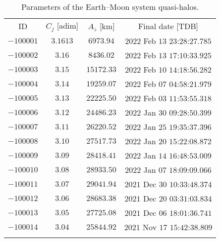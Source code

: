 %
%
\begin{table}[b!]
	\caption{Parameters of the Earth--Moon system quasi-halos.}
	\label{tab:EMquasihalo}
	\centering
	\footnotesize
	\begin{tabular}{cccc}
		\TOPlines
		ID & $C_j$ [adim] & $A_z$ [km] &  Final date [TDB] \\
		\MIDline
		$-100001$ & $3.1613$ & $6973.94$ & $2022$ Feb $13$ $23$:$28$:$27.785$ \\
		$-100002$ & $3.16$ &  $8436.02$ & $2022$ Feb $13$ $17$:$10$:$33.925$ \\
		$-100003$ & $3.15$ & $15172.33$ & $2022$ Feb $10$ $14$:$18$:$56.282$ \\
		$-100004$ & $3.14$ & $19259.07$ & $2022$ Feb $07$ $04$:$58$:$21.979$ \\
		$-100005$ & $3.13$ & $22225.50$ & $2022$ Feb $03$ $11$:$53$:$55.318$ \\
		$-100006$ & $3.12$ & $24486.23$ & $2022$ Jan $30$ $09$:$28$:$50.399$ \\
		$-100007$ & $3.11$ & $26220.52$ & $2022$ Jan $25$ $19$:$35$:$37.396$ \\
		$-100008$ & $3.10$ & $27517.73$ & $2022$ Jan $20$ $15$:$22$:$08.872$ \\
		$-100009$ & $3.09$ & $28418.41$ & $2022$ Jan $14$ $16$:$48$:$53.009$ \\
		$-100010$ & $3.08$ & $28933.50$ & $2022$ Jan $07$ $18$:$09$:$09.066$ \\
		$-100011$ & $3.07$ & $29041.94$ & $2021$ Dec $30$ $10$:$33$:$48.374$ \\
		$-100012$ & $3.06$ & $28683.38$ & $2021$ Dec $20$ $03$:$31$:$03.834$ \\
		$-100013$ & $3.05$ & $27725.08$ & $2021$ Dec $06$ $18$:$01$:$36.741$ \\
		$-100014$ & $3.04$ & $25844.92$ & $2021$ Nov $17$ $15$:$42$:$38.809$ \\
		\BOTTOMlines
	\end{tabular}
\end{table}
%

